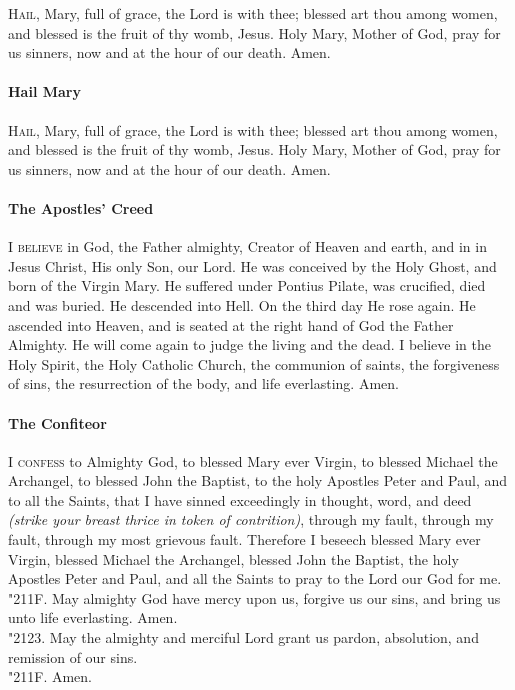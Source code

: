 \documentclass[9pt]{article}
\newcommand{\textjuni}[1]{{\fontspec{Junicode}#1}}
\begin{document}
\begin{multicols}{3}
\textsc{Hail}, Mary, full of grace, the Lord is with thee;
blessed art thou among women, and blessed is the fruit of
thy womb, Jesus.  Holy Mary, Mother of God, pray for us sinners,
now and at the hour of our death. Amen.

\paragraph{Hail Mary}

\textsc{Hail}, Mary, full of grace, the Lord is with thee;
blessed art thou among women, and blessed is the fruit of
thy womb, Jesus.  Holy Mary, Mother of God, pray for us sinners,
now and at the hour of our death. Amen.

\paragraph{The Apostles' Creed}

\textsc{I believe} in God, the Father almighty, Creator of Heaven and earth,
and in in Jesus Christ, His only Son, our Lord. He was conceived by
the Holy Ghost, and born of the Virgin Mary. He suffered under Pontius
Pilate, was crucified, died and was buried. He descended into Hell.
On the third day He rose again. He ascended into Heaven, and is seated
at the right hand of God the Father Almighty. He will come again to
judge the living and the dead. I believe in the Holy Spirit, the Holy
Catholic Church, the communion of saints, the forgiveness of sins, the
resurrection of the body, and life everlasting. Amen. 

\paragraph{The Confiteor}

\textsc{I confess} to Almighty God, to blessed Mary ever Virgin, to blessed
Michael the Archangel, to blessed John the Baptist, to the holy Apostles Peter
and Paul, and to all the Saints, that I have sinned exceedingly in thought,
word, and deed \textit{(strike your breast thrice in token of contrition)},
through my fault, through my fault, through my most grievous fault.  Therefore I
beseech blessed Mary ever Virgin, blessed Michael the Archangel, blessed John
the Baptist, the holy Apostles Peter and Paul, and all the Saints to pray to the
Lord our God for me.\\
\textjuni{\char"211F}. May almighty God have mercy upon us, forgive us our sins,
and bring us unto life everlasting.  Amen.\\
\textjuni{\char"2123}. May the almighty and merciful Lord grant us pardon,
absolution, and remission of our sins.\\
\textjuni{\char"211F}. Amen.


\end{multicols}
\end{document}
